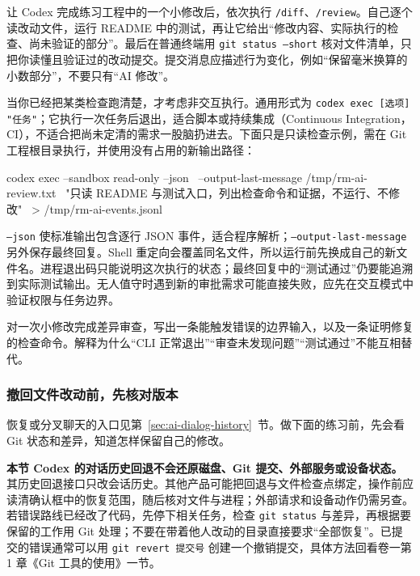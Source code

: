 \begin{example}[把一次修复变成可核对的交付]
让 Codex 完成练习工程中的一个小修改后，依次执行 \texttt{/diff}、\texttt{/review}。自己逐个读改动文件，运行 README 中的测试，再让它给出“修改内容、实际执行的检查、尚未验证的部分”。最后在普通终端用 \texttt{git status --short} 核对文件清单，只把你读懂且验证过的改动提交。提交消息应描述行为变化，例如“保留毫米换算的小数部分”，不要只有“AI 修改”。
\end{example}

当你已经把某类检查跑清楚，才考虑非交互执行。通用形式为 \texttt{codex exec [选项] "任务"}；它执行一次任务后退出，适合脚本或持续集成（Continuous Integration，CI），不适合把尚未定清的需求一股脑扔进去。下面只是只读检查示例，需在 Git 工程根目录执行，并使用没有占用的新输出路径：
\begin{tbash}
codex exec --sandbox read-only --json \
  --output-last-message /tmp/rm-ai-review.txt \
  "只读 README 与测试入口，列出检查命令和证据，不运行、不修改" \
  > /tmp/rm-ai-events.jsonl
\end{tbash}
\texttt{--json} 使标准输出包含逐行 JSON 事件，适合程序解析；\texttt{--output-last-message} 另外保存最终回复。Shell 重定向会覆盖同名文件，所以运行前先换成自己的新文件名。进程退出码只能说明这次执行的状态；最终回复中的“测试通过”仍要能追溯到实际测试输出。无人值守时遇到新的审批需求可能直接失败，应先在交互模式中验证权限与任务边界。

\begin{exercise}\label{ex:ai-cli-review}
对一次小修改完成差异审查，写出一条能触发错误的边界输入，以及一条证明修复的检查命令。解释为什么“CLI 正常退出”“审查未发现问题”“测试通过”不能互相替代。
\end{exercise}

\subsubsection{撤回文件改动前，先核对版本}
恢复或分叉聊天的入口见第~\ref{sec:ai-dialog-history}~节。做下面的练习前，先会看 Git 状态和差异，知道怎样保留自己的修改。

\begin{note}
\textbf{本节 Codex 的对话历史回退不会还原磁盘、Git 提交、外部服务或设备状态。}其历史回退接口只改会话历史。其他产品可能把回退与文件检查点绑定，操作前应读清确认框中的恢复范围，随后核对文件与进程；外部请求和设备动作仍需另查。若错误路线已经改了代码，先停下相关任务，检查 \texttt{git status} 与差异，再根据要保留的工作用 Git 处理；不要在带着他人改动的目录直接要求“全部恢复”。已提交的错误通常可以用 \texttt{git revert 提交号} 创建一个撤销提交，具体方法回看卷一第 1 章《Git 工具的使用》一节。
\end{note}


